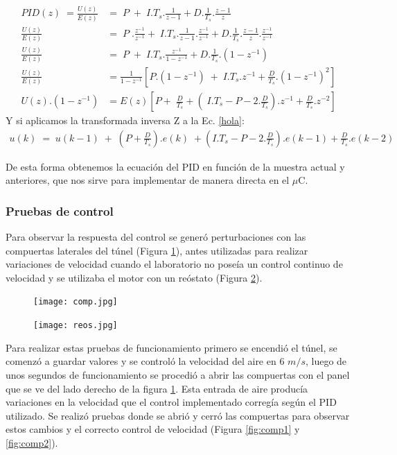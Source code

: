      \begin{align}
    PID(z)\;=\frac{U(z)}{E(z)}&=\;P\;+\;I.T_s.\frac1{z-1}+D.\frac1{T_s}.\frac{z-1}z\\\label{PIDZ}
    \frac{U(z)}{E(z)}&=\;P\;.\frac{z^{-1}}{z^{-1}}+\;I.T_s.\frac1{z-1}.\frac{z^{-1}}{z^{-1}}+D.\frac1{T_s}.\frac{z-1}z.\frac{z^{-1}}{z^{-1}}\;\\
    \frac{U(z)}{E(z)}&=\;P\;+\;I.T_s.\frac{z^{-1}}{1-z^{-1}}+D.\frac1{T_s}.(1-z^{-1})\\
    \frac{U(z)}{E(z)}&=\frac1{1-z^{-1}}\left[P.\left(1-z^{-1}\right)\;+\;I.T_s.z^{-1}+\frac D{T_s}.(1-z^{-1})^2\right]\;\\
    U(z).\left(1-z^{-1}\right)&=E(z)\left[P+\;\frac D{T_s}+\left(\;I.T_s-P-2.\frac D{T_s}\right).z^{-1}+\frac D{T_s}.z^{-2}\right]\;\label{hola}
    \end{align}
Y si aplicamos la transformada inversa Z a la Ec. \ref{hola}:
\begin{align}
	u(k)\;=\;u(k-1)\;+\;\left(P+\frac D{T_s}\right).e(k)\;+\left(I.T_s-P-2.\frac D{T_s}\right).e(k-1)+\frac D{T_s}.e(k-2)\label{ecdiscreta}
\end{align}

De esta forma obtenemos la ecuación del PID en función de la muestra actual y anteriores, que nos sirve para implementar de manera directa en el $\mu$C. 

\subsubsection{Pruebas de control}
Para observar la respuesta del control se generó perturbaciones con las compuertas laterales del túnel (Figura \ref{fig:comp}), antes utilizadas para realizar variaciones de velocidad\cite{barila1993desarrollo} cuando el laboratorio no poseía un control continuo de velocidad y se utilizaba el motor con un reóstato (Figura \ref{fig:reos}). 

\begin{figure}[H]
	\centering
	\texttt{[image: comp.jpg]}
	\label{fig:comp}
\end{figure}

\begin{figure}[H]
	\centering
	\texttt{[image: reos.jpg]}
	\label{fig:reos}
\end{figure}

Para realizar estas pruebas de funcionamiento primero se encendió el túnel, se comenzó a guardar valores y se controló la velocidad del aire en 6 $m/s$, luego de unos segundos de funcionamiento se procedió a abrir las compuertas con el panel que se ve del lado derecho de la figura \ref{fig:comp}. Esta entrada de aire producía variaciones en la velocidad que el control implementado corregía según el PID utilizado. Se realizó pruebas donde se abrió y cerró las compuertas para observar estos cambios y el correcto control de velocidad (Figura \ref{fig:comp1} y \ref{fig:comp2}).


